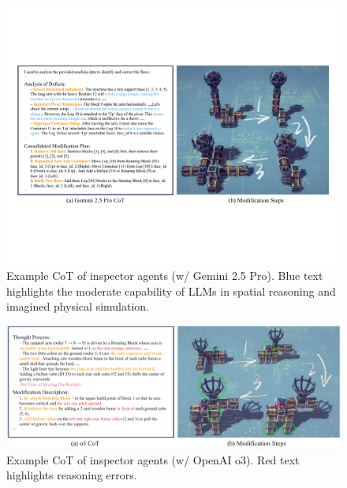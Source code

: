 \documentclass{article} %
\theoremstyle{plain}
\theoremstyle{definition}
\begin{document}
\begin{figure}[t!]
  \centering
  \vspace{-2mm}
  \includegraphics[width=0.98\linewidth]{figures/gemini_cot_example_v3.pdf}
  \vspace{-2mm}
  \captionsetup{font=footnotesize} %
  \caption{\footnotesize Example CoT of inspector agents (w/ Gemini 2.5 Pro). Blue text highlights the moderate capability of LLMs in spatial reasoning and imagined physical simulation.}
  \label{fig:gemini-cot-example}
  \vspace{-1mm}
\end{figure}

\begin{figure}[t!]
  \centering
  \includegraphics[width=0.98\linewidth]{figures/o3_cot_example_v4_green_cropped.pdf}
  \vspace{-2mm}
  \captionsetup{font=footnotesize} %
  \caption{\footnotesize Example CoT of inspector agents (w/ OpenAI o3). Red text highlights reasoning errors.}
  \label{fig:o3-cot-example}
  \vspace{-4.5mm}
\end{figure}
\end{document}
